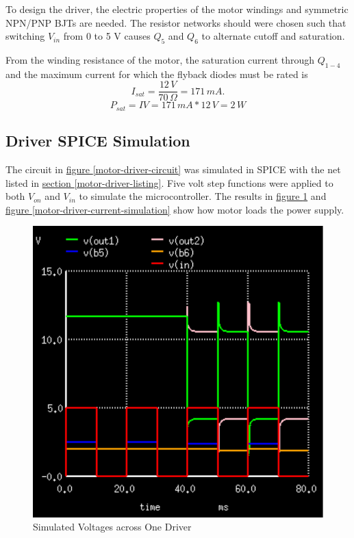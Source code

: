 \documentclass[10pt, twocolumn]{article}
\begin{document}
To design the driver, the electric properties of the motor windings
and symmetric NPN/PNP BJTs are needed.
The resistor networks should were chosen such that switching $V_{in}$ from
0 to 5 V causes $Q_{5}$ and $Q_{6}$ to alternate cutoff and saturation.

From the winding resistance of the motor, the saturation current through
$Q_{1-4}$ and the maximum current for which the flyback diodes must be rated is
\begin{equation}
I_{sat}=\frac{12\,V}{70\,\Omega}=171\,mA.
\end{equation}
\begin{equation}
P_{sat}=IV=171\,mA*12\,V=2\,W
\end{equation}

\subsection{Driver SPICE Simulation}

The circuit in
\hyperref[motor-driver-circuit]{figure \ref{motor-driver-circuit}}
was simulated in SPICE with the net listed in
\hyperref[motor-driver-listing]{section \ref{motor-driver-listing}}.
Five volt step functions were applied to both $V_{on}$ and $V_{in}$ to simulate the microcontroller.
The results in 
\hyperref[motor-driver-voltage-simulation]{figure \ref{motor-driver-voltage-simulation}}
and
\hyperref[motor-driver-current-simulation]{figure \ref{motor-driver-current-simulation}}
show how motor loads the power supply.

\begin{figure}
	\centering
	\includegraphics[width=0.75\columnwidth]{Figures/motor-driver-voltage-simulation.pdf}
	\caption{Simulated Voltages across One Driver}
	\label{motor-driver-voltage-simulation}
\end{figure}
\end{document}
